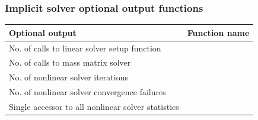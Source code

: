 \documentclass[letterpaper,10pt,english]{sphinxmanual}
\begin{document}
\subsubsection{Implicit solver optional output functions}
\label{c_interface/User_callable:cinterface-arkodeimplicitsolveroutputs}\label{c_interface/User_callable:implicit-solver-optional-output-functions}
\begin{tabulary}{\linewidth}{|L|L|}
\hline
\textbf{
Optional output
} & \textbf{
Function name
}\\\hline

No. of calls to linear solver setup function
 & 
{\hyperref[c_interface/User_callable:ARKodeGetNumLinSolvSetups]{}}
\\\hline

No. of calls to mass matrix solver
 & 
{\hyperref[c_interface/User_callable:ARKodeGetNumMassSolves]{}}
\\\hline

No. of nonlinear solver iterations
 & 
{\hyperref[c_interface/User_callable:ARKodeGetNumNonlinSolvIters]{}}
\\\hline

No. of nonlinear solver convergence failures
 & 
{\hyperref[c_interface/User_callable:ARKodeGetNumNonlinSolvConvFails]{}}
\\\hline

Single accessor to all nonlinear solver statistics
 & 
{\hyperref[c_interface/User_callable:ARKodeGetNonlinSolvStats]{}}
\\\hline
\end{tabulary}

\end{document}
